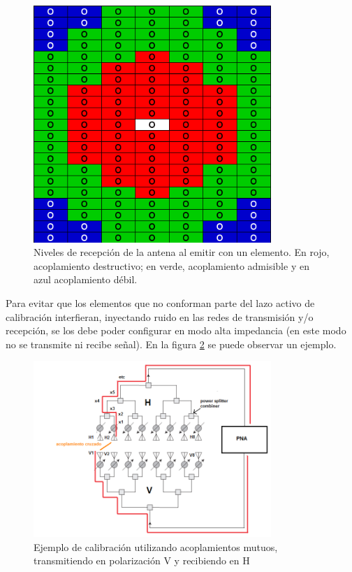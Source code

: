 \begin{figure}[H]
 \centering
 \includegraphics[width=9cm]{gfx/mutualCouplingLevels.png}
 \caption{Niveles de recepción de la antena al emitir con un elemento. En rojo, acoplamiento destructivo; en verde, 
 acoplamiento admisible y en azul acoplamiento débil.}
 \label{fig:levels}
\end{figure}

Para evitar que los elementos que no conforman parte del lazo activo de calibración interfieran, inyectando ruido en las redes 
de transmisión y/o recepción, se los debe poder configurar en modo alta impedancia (en este modo no se transmite ni recibe 
señal). En la figura \ref{fig:mutual_general} se puede observar un ejemplo.

\begin{figure}[H]
 \centering
 \includegraphics[width=9cm]{gfx/mutualCouplingExample.png}
 \caption{Ejemplo de calibración utilizando acoplamientos mutuos, transmitiendo en polarización V y recibiendo en H}
 \label{fig:mutual_general}
\end{figure}


